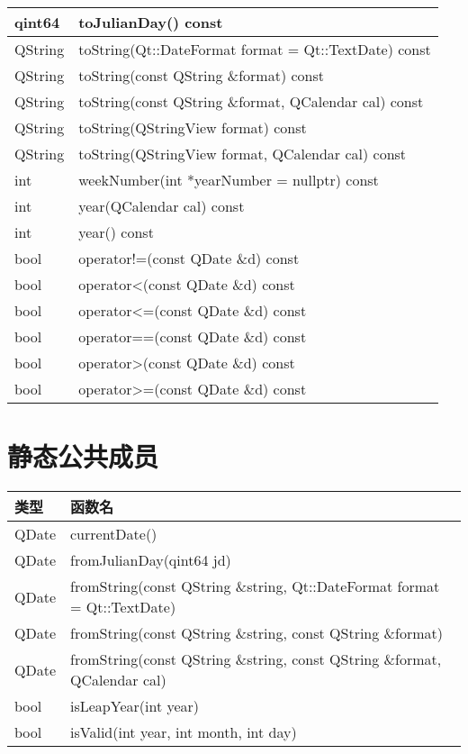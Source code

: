 \begin{longtable}{|l|m{30em}|}
\hline
qint64&	toJulianDay() const\\
\hline
QString&	toString(Qt::DateFormat format = Qt::TextDate) const\\
\hline
QString&	toString(const QString \&format) const\\
\hline
QString&	toString(const QString \&format, QCalendar cal) const\\
\hline
QString&	toString(QStringView format) const\\
\hline
QString&	toString(QStringView format, QCalendar cal) const\\
\hline
int&	weekNumber(int *yearNumber = nullptr) const\\
\hline
int&	year(QCalendar cal) const\\
\hline
int&	year() const\\
\hline
bool&	operator!=(const QDate \&d) const\\
\hline
bool&	operator<(const QDate \&d) const\\
\hline
bool&	operator<=(const QDate \&d) const\\
\hline
bool&	operator==(const QDate \&d) const\\
\hline
bool&	operator>(const QDate \&d) const\\
\hline
bool&	operator>=(const QDate \&d) const\\
\hline
\end{longtable}

\section{静态公共成员}

\begin{tabular}{|l|l|}
\hline
类型&	函数名\\
\hline
QDate&	currentDate()\\
\hline
QDate&	fromJulianDay(qint64 jd)\\
\hline
QDate&	fromString(const QString \&string, Qt::DateFormat format = Qt::TextDate)\\
\hline
QDate&	fromString(const QString \&string, const QString \&format)\\
\hline
QDate&	fromString(const QString \&string, const QString \&format, QCalendar cal)\\
\hline
bool&	isLeapYear(int year)\\
\hline
bool&	isValid(int year, int month, int day)\\
\hline
\end{tabular}

